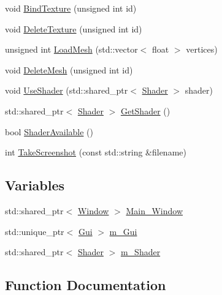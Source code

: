 \begin{DoxyCompactItemize}
\item 
void \hyperlink{namespaceTarbora_1_1GraphicsEngine_a43401d758fe6a6347980216de1326ba1}{Bind\+Texture} (unsigned int id)
\item 
void \hyperlink{namespaceTarbora_1_1GraphicsEngine_ad212ed9a51a58dc369eefb2e301ec743}{Delete\+Texture} (unsigned int id)
\item 
unsigned int \hyperlink{namespaceTarbora_1_1GraphicsEngine_a163d201479c73d4466ca74cd87a607ba}{Load\+Mesh} (std\+::vector$<$ float $>$ vertices)
\item 
void \hyperlink{namespaceTarbora_1_1GraphicsEngine_ae98495c4c24e81b1d495fd1312446d74}{Delete\+Mesh} (unsigned int id)
\item 
void \hyperlink{namespaceTarbora_1_1GraphicsEngine_a66a31b19920edf27310cb217770479b8}{Use\+Shader} (std\+::shared\+\_\+ptr$<$ \hyperlink{classTarbora_1_1Shader}{Shader} $>$ shader)
\item 
std\+::shared\+\_\+ptr$<$ \hyperlink{classTarbora_1_1Shader}{Shader} $>$ \hyperlink{namespaceTarbora_1_1GraphicsEngine_ada6e8675191b45d7896d78be9a578471}{Get\+Shader} ()
\item 
bool \hyperlink{namespaceTarbora_1_1GraphicsEngine_a8b3f957fefc40d8ab8bd54d2f421a567}{Shader\+Available} ()
\item 
int \hyperlink{namespaceTarbora_1_1GraphicsEngine_aa3bb6bce620c74256c817ee5324e2b94}{Take\+Screenshot} (const std\+::string \&filename)
\end{DoxyCompactItemize}
\subsection*{Variables}
\begin{DoxyCompactItemize}
\item 
std\+::shared\+\_\+ptr$<$ \hyperlink{classTarbora_1_1Window}{Window} $>$ \hyperlink{namespaceTarbora_1_1GraphicsEngine_a9746a5d218b0daadbf44858a3a21156b}{Main\+\_\+\+Window}
\item 
std\+::unique\+\_\+ptr$<$ \hyperlink{classTarbora_1_1Gui}{Gui} $>$ \hyperlink{namespaceTarbora_1_1GraphicsEngine_a4be33c3123e2b5a20b816da7bba5ab45}{m\+\_\+\+Gui}
\item 
std\+::shared\+\_\+ptr$<$ \hyperlink{classTarbora_1_1Shader}{Shader} $>$ \hyperlink{namespaceTarbora_1_1GraphicsEngine_a814ff9e615b93f128a28efe62fd20d7b}{m\+\_\+\+Shader}
\end{DoxyCompactItemize}


\subsection{Function Documentation}
\mbox{\label{namespaceTarbora_1_1GraphicsEngine_a3e3774928c037ea12d427d4fc2c77582}} 
